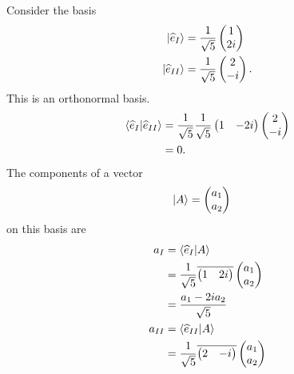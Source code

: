 \documentclass[10pt]{mypackage}
\begin{document}
\begin{example}
  Consider the basis
  \begin{align*}
    \ket{\widehat{e}_{I}} &= \frac{1}{\sqrt{5}} \begin{pmatrix}1\\2i\end{pmatrix}\\
    \ket{\widehat{e}_{II}} &= \frac{1}{\sqrt{5}} \begin{pmatrix}2\\ -i\end{pmatrix}.
  \end{align*}
  This is an orthonormal basis.
  \begin{align*}
    \braket{\widehat{e}_{I}}{\widehat{e}_{II}} &= \frac{1}{\sqrt{5}}\frac{1}{\sqrt{5}} \begin{pmatrix}1 & -2i\end{pmatrix} \begin{pmatrix}2\\-i\end{pmatrix}\\
                                       &= 0.
  \end{align*}
  The components of a vector
  \begin{align*}
    \ket{A} &= \begin{pmatrix}a_1\\a_2\end{pmatrix}
  \end{align*}
  on this basis are
  \begin{align*}
    a_{I} &= \braket{\widehat{e}_{I}}{A}\\
          &= \frac{1}{\sqrt{5}} \overline{ \begin{pmatrix}1 & 2i\end{pmatrix} } \begin{pmatrix}a_1\\a_2\end{pmatrix}\\
          &= \frac{a_1 - 2ia_2}{\sqrt{5}}\\
    a_{II} &= \braket{\widehat{e}_{II}}{A}\\
           &= \frac{1}{\sqrt{5}} \overline{ \begin{pmatrix}2 & -i\end{pmatrix} } \begin{pmatrix}a_1\\a_2\end{pmatrix}\\

\end{align*}
\end{example}
\end{document}

